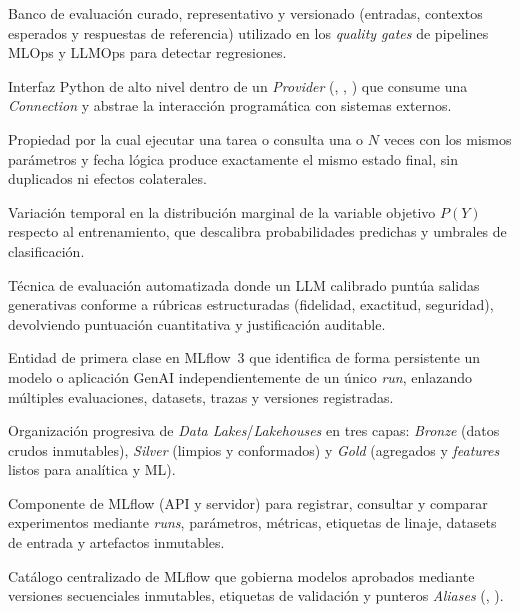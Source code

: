 {\begin{description}[style=standard, itemsep=2pt, parsep=0pt, topsep=4pt, leftmargin=1.1em, font=\sffamily\bfseries\color{PrimaryDark}]
\item[Golden Dataset.]
Banco de evaluación curado, representativo y versionado (entradas, contextos esperados y respuestas de referencia) utilizado en los \textit{quality gates} de pipelines MLOps y LLMOps para detectar regresiones.

\item[Hook (Airflow).]
Interfaz Python de alto nivel dentro de un \textit{Provider} (, , ) que consume una \textit{Connection} y abstrae la interacción programática con sistemas externos.

\item[Idempotencia.]
Propiedad por la cual ejecutar una tarea o consulta una o $N$ veces con los mismos parámetros y fecha lógica produce exactamente el mismo estado final, sin duplicados ni efectos colaterales.

\item[Label Drift.]
Variación temporal en la distribución marginal de la variable objetivo $P(Y)$ respecto al entrenamiento, que descalibra probabilidades predichas y umbrales de clasificación.

\item[LLM-as-a-Judge.]
Técnica de evaluación automatizada donde un LLM calibrado puntúa salidas generativas conforme a rúbricas estructuradas (fidelidad, exactitud, seguridad), devolviendo puntuación cuantitativa y justificación auditable.

\item[LoggedModel (MLflow 3).]
Entidad de primera clase en MLflow~3 que identifica de forma persistente un modelo o aplicación GenAI independientemente de un único \textit{run}, enlazando múltiples evaluaciones, datasets, trazas y versiones registradas.

\item[Medallion Architecture.]
Organización progresiva de \textit{Data Lakes}/\textit{Lakehouses} en tres capas: \textit{Bronze} (datos crudos inmutables), \textit{Silver} (limpios y conformados) y \textit{Gold} (agregados y \textit{features} listos para analítica y ML).

\item[MLflow Tracking.]
Componente de MLflow (API y servidor) para registrar, consultar y comparar experimentos mediante \textit{runs}, parámetros, métricas, etiquetas de linaje, datasets de entrada y artefactos inmutables.

\item[Model Registry.]
Catálogo centralizado de MLflow que gobierna modelos aprobados mediante versiones secuenciales inmutables, etiquetas de validación y punteros \textit{Aliases} (, ).


\end{description}}
